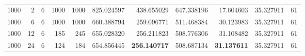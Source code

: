\begin{table}
\begin{tabular}{rrrrrrrrrrr}
1000 & 2 & 6 & 1000 & 1000 & 825.024597 & 438.655029 & 647.338196 & 17.604603 & 35.327911 & 61 \\
1000 & 6 & 6 & 1000 & 1000 & 660.388794 & 259.096771 & 511.468384 & 30.123983 & 35.327911 & 61 \\
1000 & 12 & 6 & 185 & 245 & 655.028320 & 256.211823 & 508.776306 & 31.108482 & 35.327911 & 61 \\
1000 & 24 & 6 & 124 & 184 & 654.856445 & \textbf{256.140717} & 508.687134 & \textbf{31.137611} & 35.327911 & 61 \\
\bottomrule
\end{tabular}
\end{table}

